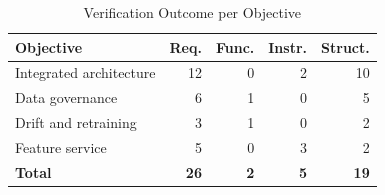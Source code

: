 
\begin{table}[!t]
\caption{Verification Outcome per Objective}
\label{tab:verification}
\centering
\footnotesize
\begin{tabular}{@{}lrrrr@{}}
\toprule
\textbf{Objective} & \textbf{Req.} & \textbf{Func.} & \textbf{Instr.} & \textbf{Struct.} \\
\midrule
Integrated architecture & 12 & 0 & 2 & 10 \\
Data governance & 6  & 1 & 0 & 5 \\
Drift and retraining & 3  & 1 & 0 & 2 \\
Feature service & 5  & 0 & 3 & 2 \\
\midrule
\textbf{Total} & \textbf{26} & \textbf{2} & \textbf{5} & \textbf{19} \\
\bottomrule
\end{tabular}
\end{table}
